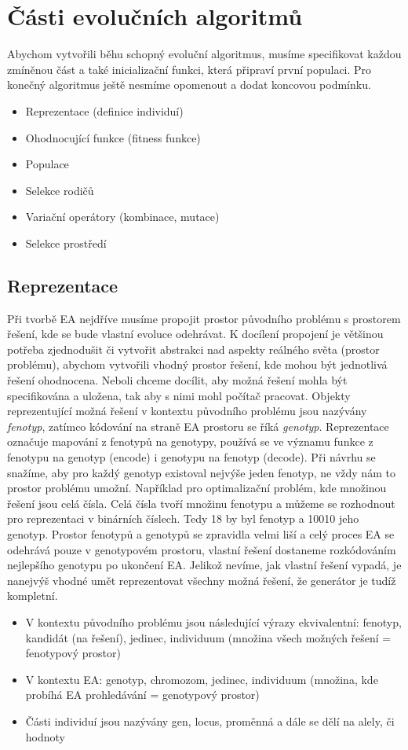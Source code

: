 \section{Části evolučních algoritmů}
Abychom vytvořili běhu schopný evoluční algoritmus, musíme specifikovat každou zmíněnou část a také inicializační funkci, která připraví první populaci. Pro konečný algoritmus ještě nesmíme opomenout a dodat koncovou podmínku. 
\begin{itemize}
\item{Reprezentace (definice individuí)}
\item{Ohodnocující funkce (fitness funkce)}
\item{Populace}
\item{Selekce rodičů}
\item{Variační operátory (kombinace, mutace)}
\item{Selekce prostředí}
\end{itemize}
\subsection*{Reprezentace}
Při tvorbě EA nejdříve musíme propojit prostor původního problému s prostorem řešení, kde se bude vlastní evoluce odehrávat. K docílení propojení je většinou potřeba zjednodušit či vytvořit abstrakci nad aspekty reálného světa (prostor problému), abychom vytvořili vhodný prostor řešení, kde mohou být jednotlivá řešení ohodnocena. Neboli chceme docílit, aby možná řešení mohla být specifikována a uložena, tak aby s nimi mohl počítač pracovat. Objekty reprezentující možná řešení v kontextu původního problému jsou nazývány \textit{fenotyp}, zatímco kódování na straně EA prostoru se říká \textit{genotyp}. Reprezentace označuje mapování z fenotypů na genotypy, používá se ve významu funkce z fenotypu na genotyp (encode) i genotypu na fenotyp (decode).  Při návrhu se snažíme, aby pro každý genotyp existoval nejvýše jeden fenotyp, ne vždy nám to prostor problému umožní. Například pro optimalizační problém, kde množinou řešení jsou celá čísla. Celá čísla tvoří množinu fenotypu a můžeme se rozhodnout pro reprezentaci v binárních číslech. Tedy 18 by byl fenotyp a 10010 jeho genotyp. Prostor fenotypů a genotypů se zpravidla velmi liší a celý proces EA se odehrává pouze v genotypovém prostoru, vlastní řešení dostaneme rozkódováním nejlepšího genotypu po ukončení EA. Jelikož nevíme, jak vlastní řešení vypadá, je nanejvýš vhodné umět reprezentovat všechny možná řešení, že generátor je tudíž kompletní.
\begin{itemize}   
  \item V kontextu původního problému jsou následující výrazy ekvivalentní: fenotyp, kandidát (na řešení), jedinec, individuum (množina všech možných řešení = fenotypový prostor)
  \item V kontextu EA: genotyp, chromozom, jedinec, individuum (množina, kde probíhá EA prohledávání = genotypový prostor)
  \item Části individuí jsou nazývány gen, locus, proměnná a dále se dělí na alely, či hodnoty
  \end{itemize}
